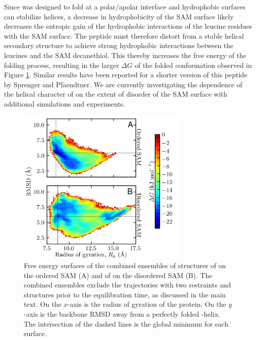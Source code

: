 Since \pep{} was designed to fold at a polar/apolar interface\cite{DeGrado1985} and hydrophobic surfaces can stabilize helices\cite{Levine2016}, a decrease in hydrophobicity of the SAM surface likely decreases the entropic gain of the hydrophobic interactions of the leucine residues with the SAM surface. 
The peptide must therefore distort from a stable helical secondary structure to achieve strong hydrophobic interactions between the leucines and the SAM decanethiol. 
This thereby increases the free energy of the folding process, resulting in the larger $\Delta G$ of the folded conformation observed in Figure \ref{fig:helix-free_order}. 
Similar results have been reported for a shorter version of this peptide by Sprenger and Pfaendtner\cite{Sprenger2016}. 
We are currently investigating the dependence of the helical character of \pep{} on the extent of disorder of the SAM surface with additional simulations and experiments.  

\begin{figure}
    \center
    \includegraphics[width=3.25in]{figures-helix/comparison_free_energy_plots.png}
    \caption{
        Free energy surfaces of the combined ensembles of structures of \pep{} on the ordered SAM (A) and of \pep{} on the disordered SAM (B). 
        The combined ensembles exclude the trajectories with two restraints and structures prior to the equilibration time, as discussed in the main text. 
        On the $x$-axis is the radius of gyration of the protein. 
        On the $y$-axis is the backbone RMSD away from a perfectly folded \textalpha{}-helix. 
        The intersection of the dashed lines is the global minimum for each surface. 
    }
    \label{fig:helix-free_order}
\end{figure}

